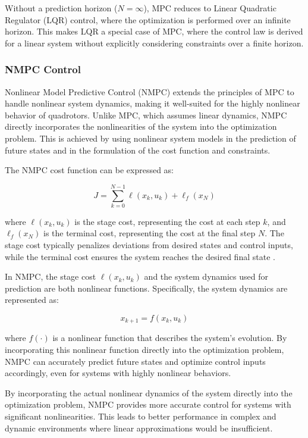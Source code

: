 \documentclass{UoNMCHA}
\numberwithin{equation}{section}
\begin{document}
Without a prediction horizon (\( N = \infty \)), MPC reduces to Linear Quadratic Regulator (LQR) control, where the optimization is performed over an infinite horizon. This makes LQR a special case of MPC, where the control law is derived for a linear system without explicitly considering constraints over a finite horizon.


\subsubsection{NMPC Control}

Nonlinear Model Predictive Control (NMPC) extends the principles of MPC to handle nonlinear system dynamics, making it well-suited for the highly nonlinear behavior of quadrotors. Unlike MPC, which assumes linear dynamics, NMPC directly incorporates the nonlinearities of the system into the optimization problem. This is achieved by using nonlinear system models in the prediction of future states and in the formulation of the cost function and constraints.

The NMPC cost function can be expressed as:

\begin{equation}
J = \sum_{k=0}^{N-1} \ell(x_k, u_k) + \ell_f(x_N)
\label{eq:cost_function}
\end{equation}
    

where \(\ell(x_k, u_k)\) is the stage cost, representing the cost at each step \(k\), and \(\ell_f(x_N)\) is the terminal cost, representing the cost at the final step \(N\). The stage cost typically penalizes deviations from desired states and control inputs, while the terminal cost ensures the system reaches the desired final state \cite{website:NLMPC}.

In NMPC, the stage cost \(\ell(x_k, u_k)\) and the system dynamics used for prediction are both nonlinear functions. Specifically, the system dynamics are represented as:

\begin{equation}
x_{k+1} = f(x_k, u_k)
\label{eq:state_update}
\end{equation}
    

where \(f(\cdot)\) is a nonlinear function that describes the system's evolution. By incorporating this nonlinear function directly into the optimization problem, NMPC can accurately predict future states and optimize control inputs accordingly, even for systems with highly nonlinear behaviors.

By incorporating the actual nonlinear dynamics of the system directly into the optimization problem, NMPC provides more accurate control for systems with significant nonlinearities. This leads to better performance in complex and dynamic environments where linear approximations would be insufficient.
\end{document}
